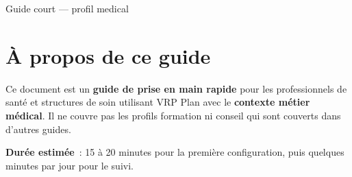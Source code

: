 \begin{titlepage}
  \centering
  \vspace*{1.5cm}
  {\Large\textsf{\manualeditor}\par}
  \vspace{1.2cm}
  {\fontsize{36}{42}\selectfont\bfseries\color{vrpdark}\manueltitle\par}
  \vspace{0.6cm}
  {\LARGE\manualsubtitle\par}
  \vspace{1.5cm}
  \vfill
  {\large\manualversion\par}
  \vspace{0.4cm}
  {\small Guide court — profil medical\par}
\end{titlepage}

\section*{À propos de ce guide}

Ce document est un \textbf{guide de prise en main rapide} pour les professionnels de santé et structures de soin utilisant VRP Plan avec le \textbf{contexte métier médical}. Il ne couvre pas les profils formation ni conseil qui sont couverts dans d'autres guides.

\textbf{Durée estimée}~: 15 à 20 minutes pour la première configuration, puis quelques minutes par jour pour le suivi.

